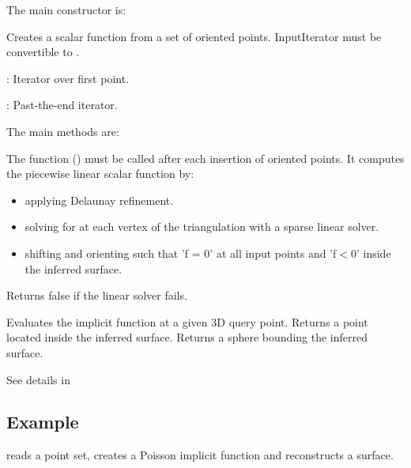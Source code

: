 The main constructor is:

{
Creates a scalar function from a set of oriented points.
\ccPrecond InputIterator  must be convertible to .
\begin{description}
\item {}: Iterator over first point. \item {}: Past-the-end iterator. \end{description}
}

The main methods are:

{
The function () must be called after each insertion of oriented points. It computes the piecewise linear scalar function  by:\begin{itemize}
\item applying Delaunay refinement.\item solving for  at each vertex of the triangulation with a sparse linear solver.\item shifting and orienting  such that 'f = 0' at all input points and 'f$<$0' inside the inferred surface.\end{itemize}
Returns false if the linear solver fails.
}
\ccGlue
{}
{
Evaluates the implicit function at a given 3D query point.
}
\ccGlue
{}
{
Returns a point located inside the inferred surface.
}
{
Returns a sphere bounding the inferred surface.
}

See details in \\


\subsection{Example}

 reads a point set, creates a Poisson implicit function and reconstructs a surface.



